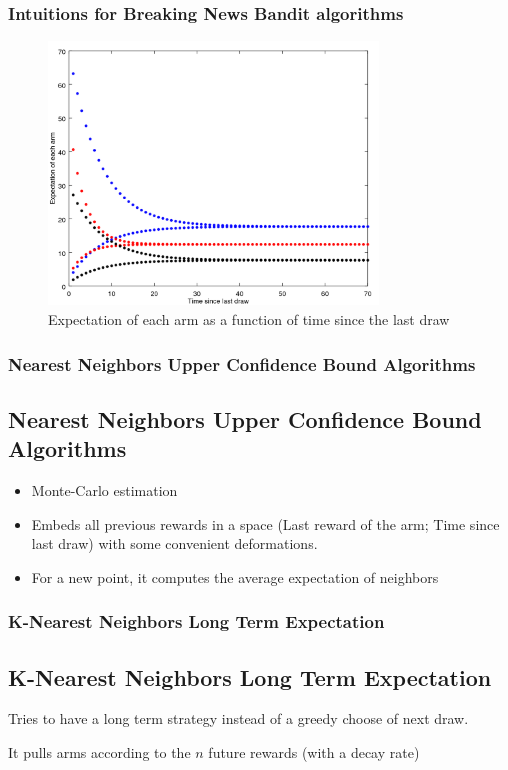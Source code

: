 \documentclass[french]{beamer}
\begin{document}
\begin{frame}
	\frametitle{Intuitions for Breaking News Bandit algorithms}
	\begin{figure}[h]
		\begin{center}
			\includegraphics[width=0.78\textwidth]{expectations.png}
		\end{center}
		\caption{Expectation of each arm as a function of time since the last draw}
	\end{figure}

\end{frame}

\begin{frame}
	\frametitle{Nearest Neighbors Upper Confidence Bound Algorithms}

	\subsection{Nearest Neighbors Upper Confidence Bound Algorithms}

	\begin{itemize}
		\item Monte-Carlo estimation
		\item Embeds all previous rewards in a space (Last reward of the arm; Time since last draw) with some convenient deformations.
		\item For a new point, it computes the average expectation of neighbors
	\end{itemize}

\end{frame}

\begin{frame}
	\frametitle{K-Nearest Neighbors Long Term Expectation}

	\subsection{K-Nearest Neighbors Long Term Expectation}

	Tries to have a long term strategy instead of a greedy choose of next draw.
	\newline

	It pulls arms according to the $n$ future rewards (with a decay rate)

\end{frame}
\end{document}
